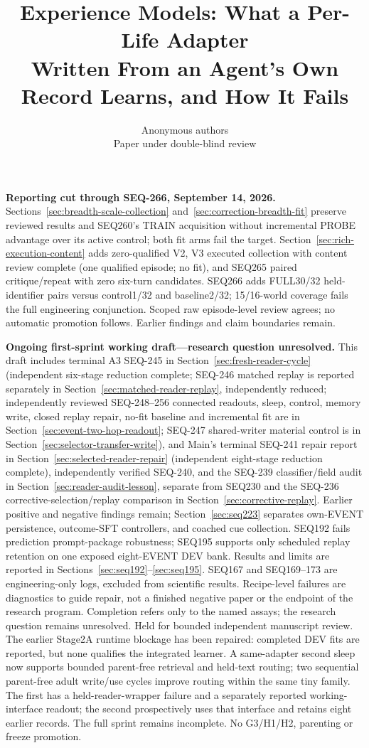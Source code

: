 \documentclass{article}
\title{Experience Models: What a Per-Life Adapter\\Written From an Agent's Own Record Learns, and How It Fails}
\author{Anonymous authors\\Paper under double-blind review}
\begin{document}
\maketitle

\noindent\textbf{Reporting cut through SEQ-266, September 14, 2026.}
Sections~\ref{sec:breadth-scale-collection} and~\ref{sec:correction-breadth-fit}
preserve reviewed results and SEQ260's TRAIN acquisition without incremental
PROBE advantage over its active control; both fit arms fail the target.
Section~\ref{sec:rich-execution-content} adds zero-qualified V2, V3 executed
collection with content review complete (one qualified episode; no fit),
and SEQ265 paired critique/repeat with zero
six-turn candidates. SEQ266 adds FULL30/32 held-identifier pairs versus control1/32 and baseline2/32;
15/16-world coverage fails the full engineering conjunction. Scoped raw episode-level review
agrees; no automatic promotion follows.
Earlier findings and claim boundaries remain.

\noindent\textbf{Ongoing first-sprint working draft---research question unresolved.}
This draft includes terminal A3 SEQ-245 in Section~\ref{sec:fresh-reader-cycle}
(independent six-stage reduction complete; SEQ-246 matched replay is
reported separately in Section~\ref{sec:matched-reader-replay}, independently reduced;
independently reviewed SEQ-248--256 connected readouts, sleep, control, memory write, closed replay repair, no-fit baseline and incremental fit are in
Section~\ref{sec:event-two-hop-readout}; SEQ-247 shared-writer material control
is in Section~\ref{sec:selector-transfer-write}), and
Main's terminal SEQ-241 repair report in
Section~\ref{sec:selected-reader-repair} (independent eight-stage reduction complete),
independently verified SEQ-240, and the SEQ-239 classifier/field audit
in Section~\ref{sec:reader-audit-lesson}, separate from SEQ230 and the
SEQ-236 corrective-selection/replay comparison in Section~\ref{sec:corrective-replay}. Earlier positive and negative findings
remain; Section~\ref{sec:seq223} separates
own-EVENT persistence, outcome-SFT controllers, and coached cue collection.
SEQ192 fails prediction prompt-package robustness; SEQ195 supports only
scheduled replay retention on one exposed eight-EVENT DEV bank. Results and
limits are reported in Sections~\ref{sec:seq192}--\ref{sec:seq195}.
SEQ167 and SEQ169--173 are engineering-only logs, excluded from scientific results.
Recipe-level failures are diagnostics to guide repair, not a finished negative
paper or the endpoint of the research program. Completion refers only to the
named assays; the research question remains unresolved. Held for bounded
independent manuscript review. The earlier Stage2A runtime blockage has been
repaired: completed DEV fits are reported, but none qualifies the integrated
learner. A same-adapter second sleep now supports bounded parent-free retrieval
and held-text routing; two sequential parent-free adult write/use cycles improve
routing within the same tiny family. The first has a held-reader-wrapper failure
and a separately reported working-interface readout; the second prospectively
uses that interface and retains eight earlier records. The full sprint
remains incomplete. No G3/H1/H2, parenting or freeze promotion.
\end{document}
